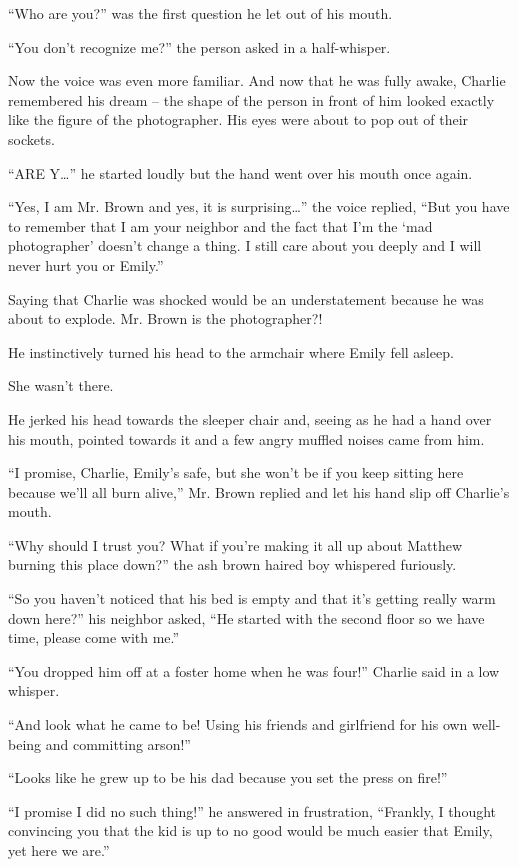 “Who are you?” was the first question he let out of his mouth.

“You don’t recognize me?” the person asked in a half-whisper.

Now the voice was even more familiar. And now that he was fully awake, Charlie remembered his dream – the shape of the person in front of him looked exactly like the figure of the photographer. His eyes were about to pop out of their sockets.

“ARE Y…” he started loudly but the hand went over his mouth once again.

“Yes, I am Mr. Brown and yes, it is surprising…” the voice replied, “But you have to remember that I am your neighbor and the fact that I’m the ‘mad photographer’ doesn’t change a thing. I still care about you deeply and I will never hurt you or Emily.”

Saying that Charlie was shocked would be an understatement because he was about to explode. Mr. Brown is the photographer?!

He instinctively turned his head to the armchair where Emily fell asleep.

She wasn’t there.

He jerked his head towards the sleeper chair and, seeing as he had a hand over his mouth, pointed towards it and a few angry muffled noises came from him.

“I promise, Charlie, Emily’s safe, but she won’t be if you keep sitting here because we’ll all burn alive,” Mr. Brown replied and let his hand slip off Charlie’s mouth.

“Why should I trust you? What if you’re making it all up about Matthew burning this place down?” the ash brown haired boy whispered furiously.

“So you haven’t noticed that his bed is empty and that it’s getting really warm down here?” his neighbor asked, “He started with the second floor so we have time, please come with me.”

“You dropped him off at a foster home when he was four!” Charlie said in a low whisper.

“And look what he came to be! Using his friends and girlfriend for his own well-being and committing arson!”

“Looks like he grew up to be his dad because you set the press on fire!”

“I promise I did no such thing!” he answered in frustration, “Frankly, I thought convincing you that the kid is up to no good would be much easier that Emily, yet here we are.”

